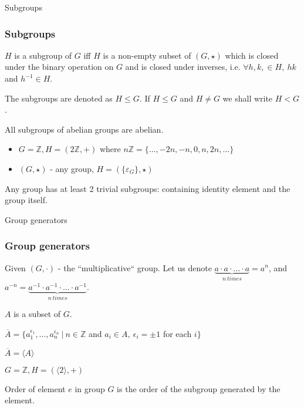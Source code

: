 \documentclass{beamer}
\begin{document}
\begin{frame}{Subgroups}
	\subsubsection{Subgroups}
	\begin{definition}[of subgroup]
		$H$ is a subgroup of $G$ iff $H$ is a non-empty subset of $(G, \star)$ which is closed under the binary 
		operation on $G$ and is closed under inverses, i.e. $\forall h, k, \in H, \ hk$ and $h^{-1} \in H$. 
		
		The	subgroups are denoted as $H \le G$. If $H \le G$ and $H \ne G$ we shall write $H < G$.
	\end{definition}
	\begin{prop}
		All subgroups of abelian groups are abelian.
	\end{prop}
	\begin{example}
		\begin{itemize}
			\item $G = \mathbb{Z}, H = (2\mathbb{Z}, +)$ \newline
			where $n\mathbb{Z} = \{\ldots, -2n, -n, 0, n, 2n, \ldots\}$
			\item $(G, \star)$ - any group, $H = (\{\varepsilon_G\}, \star)$
		\end{itemize}
	\end{example}
	Any group has at least 2 trivial subgroups: containing identity element and the group itself.
\end{frame}

\begin{frame}{Group generators}
	\subsubsection{Group generators}
	\begin{definition}
		Given $(G, \cdot)$ - the ``multiplicative`` group. \newline
		Let us denote $\underbrace{a \cdot a \cdot \ldots \cdot a}_{n\ times} = a^n$, and \newline
		$a^{-n} = \underbrace{a^{-1} \cdot a^{-1} \cdot \ldots \cdot a^{-1}}_{n\ times}$.
	\end{definition}
	\begin{definition}
		$A$ is a subset of $G$.

		$\overline{A} = \{a_1^{\epsilon_1},\ldots, a_n^{\epsilon_n}\ \vert\ n \in \mathbb{Z}$ and $a_i \in A,\ 
		\epsilon_i = \pm 1$ for each $i \}$
		
		$\overline{A} = \langle A \rangle$ 
	\end{definition}
	\begin{example}
		$G = \mathbb{Z}, H = (\langle 2 \rangle, +)$
	\end{example}
	\begin{definition}
		Order of element $e$ in group $G$ is the order of the subgroup generated by the element.
	\end{definition}
\end{frame}
\end{document}
